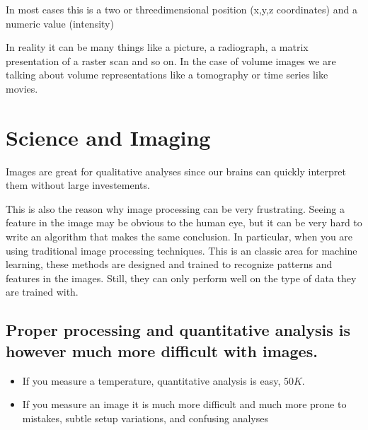 \documentclass[letterpaper,10pt,english]{sphinxmanual}
\begin{document}
In most cases this is a two\sphinxhyphen{} or three\sphinxhyphen{}dimensional position (x,y,z coordinates) and a numeric value (intensity)

In reality it can be many things like a picture, a radiograph, a matrix presentation of a raster scan and so on. In the case of volume images we are talking about volume representations like a tomography or time series like movies.


\section{Science and Imaging}
\label{\detokenize{ML4NeutronImageSegmentation:science-and-imaging}}
Images are great for qualitative analyses since our brains can quickly interpret them without large  investements.

This is also the reason why image processing can be very frustrating. Seeing a feature in the image may be obvious to the human eye, but it can be very hard to write an algorithm that makes the same conclusion. In particular, when you are using traditional image processing techniques. This is an classic area for machine learning, these methods are designed and trained to recognize patterns and features in the images. Still, they can only perform well on the type of data they are trained with.


\subsection{Proper processing and quantitative analysis is however much more difficult with images.}
\label{\detokenize{ML4NeutronImageSegmentation:proper-processing-and-quantitative-analysis-is-however-much-more-difficult-with-images}}\begin{itemize}
\item {} 
If you measure a temperature, quantitative analysis is easy, \(50K\).

\item {} 
If you measure an image it is much more difficult and much more prone to mistakes, subtle setup variations, and confusing analyses

\end{itemize}
\end{document}

